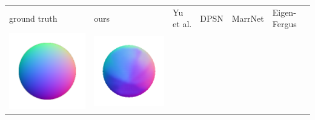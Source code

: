 \begin{tabularx}{\linewidth}{@{}Y@{}Y@{}Y@{}Y@{}Y@{}Y@{}}
ground truth & ours & Yu et al. & DPSN & MarrNet & Eigen-Fergus \\
\includegraphics[width=\linewidth]{semisynthetic/20150514_13_gt.png} &
\includegraphics[width=\linewidth]{semisynthetic/20150514_13_ours_out.png} &

\end{tabularx}

